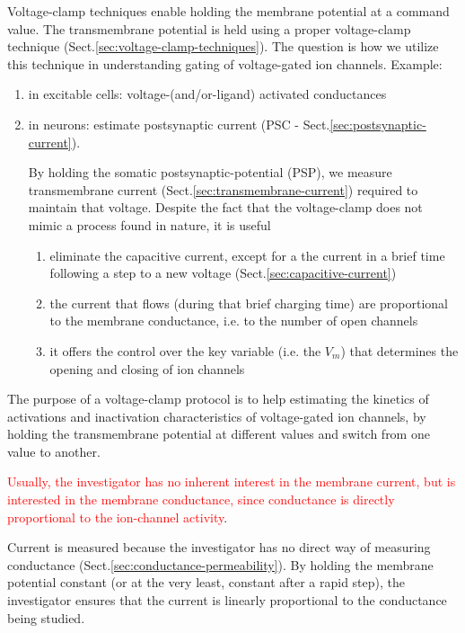 Voltage-clamp techniques enable holding the membrane potential at a command
value. The transmembrane potential is held using a proper
voltage-clamp technique (Sect.\ref{sec:voltage-clamp-techniques}).
The question is how we utilize this technique in understanding gating of
voltage-gated ion channels. Example:
\begin{enumerate}

  \item in excitable cells: voltage-(and/or-ligand) activated conductances

  \item  in neurons: estimate  postsynaptic current (PSC -
  Sect.\ref{sec:postsynaptic-current}).

  By holding the somatic postsynaptic-potential (PSP), we measure transmembrane
  current (Sect.\ref{sec:transmembrane-current}) required to maintain that
  voltage.  Despite the fact that the voltage-clamp does not mimic a process
  found in nature, it is useful
  \begin{enumerate}
    \item eliminate the capacitive current, except for a the current in a brief
    time following a step to a new voltage (Sect.\ref{sec:capacitive-current})

    \item the current that flows (during that brief charging time) are
    proportional to the membrane conductance, i.e. to the number of open channels

    \item it offers the control over the key variable (i.e. the $V_m$) that
    determines the opening and closing of ion channels
  \end{enumerate}

\end{enumerate}

The purpose of a voltage-clamp protocol is to help estimating the kinetics of
activations and inactivation characteristics of voltage-gated ion channels, by
holding the transmembrane potential at different values and switch from one
value to another.

\begin{mdframed}

\textcolor{red}{Usually, the investigator has no inherent interest in the
membrane current, but is interested in the membrane conductance, since
conductance is directly proportional to the ion-channel activity}. 

Current is measured because the investigator has no direct way of measuring
conductance (Sect.\ref{sec:conductance-permeability}). By holding the membrane
potential constant (or at the very least, constant after a rapid step), the
investigator ensures that the current is linearly proportional to the
conductance being studied.

\end{mdframed}


